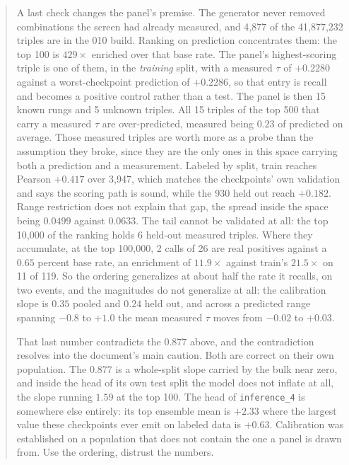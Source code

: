 \documentclass[10pt,a4paper]{article}
\theoremstyle{tcplain}
\begin{document}
\begin{abstract}
A last check changes the panel's premise. The generator never removed
combinations the screen had already measured, and 4{,}877 of the 41{,}877{,}232
triples are in the 010 build. Ranking on prediction concentrates them: the top
100 is $429\times$ enriched over that base rate. The panel's highest-scoring
triple is one of them, in the \emph{training} split, with a measured $\tau$ of
$+0.2280$ against a worst-checkpoint prediction of $+0.2286$, so that entry is
recall and becomes a positive control rather than a test. The panel is then 15
known rungs and 5 unknown triples. All 15 triples of the top 500 that carry a
measured $\tau$ are over-predicted, measured being $0.23$ of predicted on average.
Those measured triples are worth more as a probe than the assumption they broke,
since they are the only ones in this space carrying both a prediction and a
measurement. Labeled by split, train reaches Pearson $+0.417$ over 3{,}947, which
matches the checkpoints' own validation and says the scoring path is sound, while
the 930 held out reach $+0.182$. Range restriction does not explain that gap, the
spread inside the space being $0.0499$ against $0.0633$. The tail cannot be
validated at all: the top 10{,}000 of the ranking holds 6 held-out measured
triples. Where they accumulate, at the top 100{,}000, 2 calls of 26 are real
positives against a $0.65$ percent base rate, an enrichment of $11.9\times$
against train's $21.5\times$ on 11 of 119. So the ordering generalizes at about
half the rate it recalls, on two events, and the magnitudes do not generalize at
all: the calibration slope is $0.35$ pooled and $0.24$ held out, and across a
predicted range spanning $-0.8$ to $+1.0$ the mean measured $\tau$ moves from
$-0.02$ to $+0.03$.

That last number contradicts the $0.877$ above, and the contradiction resolves
into the document's main caution. Both are correct on their own population. The
$0.877$ is a whole-split slope carried by the bulk near zero, and inside the head
of its own test split the model does not inflate at all, the slope running $1.59$
at the top 100. The head of \texttt{inference\_4} is somewhere else entirely: its
top ensemble mean is $+2.33$ where the largest value these checkpoints ever emit
on labeled data is $+0.63$. Calibration was established on a population that does
not contain the one a panel is drawn from. Use the ordering, distrust the
numbers.
\end{abstract}

\vspace{0.5em}
\tccontents
\clearpage














\end{document}

